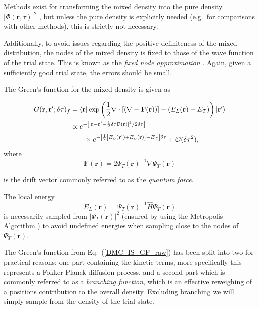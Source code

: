 \documentclass[amsmath, amssymb, aps, floatfix, nofootinbib, preprintnumbers,showpacs, superscriptaddress, twocolumn]{revtex4-1}
\newcommand{\ket}[1]{| #1 \rangle}
\newcommand{\bra}[1]{\langle #1 |}
\begin{document}
Methods exist for transforming the mixed density into the pure density $|\Phi(\mathbf{r}, \tau)|^2$ \cite{abInitioMC}, but unless the pure density is explicitly needed (e.g.~for comparisons with other methods), this is strictly not necessary.

Additionally, to avoid issues regarding the positive definiteness of the mixed distribution, the nodes of the mixed density is fixed to those of the wave function of the trial state. This is known as the \textit{fixed node approximation} \cite{umrigar:2865, abInitioMC}. Again, given a sufficiently good trial state, the errors should be small.

The Green's function for the mixed density is given as \cite{umrigar:2865}

\begin{align}
  G(\mathbf{r}, \mathbf{r}'; \delta\tau)_f &= \bra{\mathbf{r}} \exp\left({\frac{1}{2}\nabla\cdot \left[\left(\nabla - \mathbf{F}(\mathbf{r})\right)\right] - \left(E_L(\mathbf{r}) - E_T\right)}\right)\ket{\mathbf{r}'} \label{eq:DMC_IS_GF_raw}\\
  &\propto e^{-\left[|\mathbf{r} - \mathbf{r}' - \frac{1}{2}\delta\tau\mathbf{F}(\mathbf{r})|^2/2\delta\tau\right]} \label{eq:DMC_IS_GF}\\
  &\qquad\times e^{-\left[\frac{1}{2}\left[E_L(\mathbf{r'}) + E_L(\mathbf{r})\right] - E_T\right]\delta\tau} + \mathcal{O}(\delta\tau^2), \notag
\end{align}
where
\begin{equation}
  \mathbf{F}(\mathbf{r}) = 2\Psi_T(\mathbf{r})^{-1} \nabla \Psi_T(\mathbf{r})
\end{equation}

\noindent
is the drift vector commonly referred to as the \textit{quantum force}.

The local energy
\begin{equation}
E_L(\mathbf{r}) = \Psi_T(\mathbf{r})^{-1}\hat{H} \Psi_T(\mathbf{r})
\end{equation}
is necessarily sampled from $|\Psi_T(\mathbf{r})|^2$ (ensured by using the Metropolis Algorithm \cite{abInitioMC}) to avoid undefined energies when sampling close to the nodes of $\Psi_T(\mathbf{r})$.

The Green's function from Eq.~(\ref{DMC_IS_GF_raw}) has been split into two for practical reasons; one part containing the kinetic terms, more specifically this represents a Fokker-Planck diffusion process, and a second part which is commonly referred to as a \textit{branching function}, which is an effective reweighing of a positions contribution to the overall density. Excluding branching we will simply sample from the density of the trial state.
\end{document}
